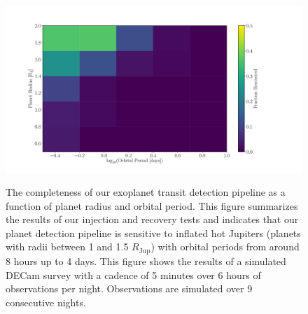 \begin{figure}
  \caption{The completeness of our exoplanet transit detection pipeline as a
    function of planet radius and orbital period.
    This figure summarizes the results of our injection and recovery tests and
    indicates that our planet detection pipeline is sensitive to inflated hot
    Jupiters (planets with radii between 1 and 1.5 $R_{\mathrm{Jup}}$) with
    orbital periods from around 8 hours up to 4 days.
    This figure shows the results of a simulated DECam survey with a cadence
    of 5 minutes over 6 hours of observations per night.  Observations are
    simulated over 9 consecutive nights.
}
  \centering
    \includegraphics[width=1\textwidth]{completeness.pdf}
\label{fig:completeness}
\end{figure}


